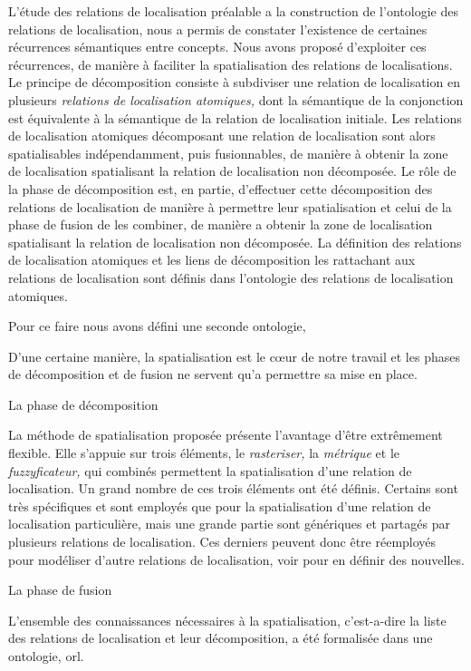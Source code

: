 L'étude des relations de localisation préalable a la construction de
l'ontologie des relations de localisation, nous a permis de constater
l’existence de certaines récurrences sémantiques entre concepts. Nous
avons proposé d'exploiter ces récurrences, de manière à faciliter la
spatialisation des relations de localisations. Le principe de
décomposition consiste à subdiviser une relation de localisation en
plusieurs \emph{relations de localisation atomiques,} dont la
sémantique de la conjonction est équivalente à la sémantique de la
relation de localisation initiale. Les relations de localisation
atomiques décomposant une relation de localisation sont alors
spatialisables indépendamment, puis fusionnables, de manière à obtenir
la zone de localisation spatialisant la relation de localisation non
décomposée.
%
Le rôle de la phase de décomposition est, en partie, d'effectuer cette
décomposition des relations de localisation de manière à permettre
leur spatialisation et celui de la phase de fusion de les combiner, de
manière a obtenir la zone de localisation spatialisant la relation de
localisation non décomposée.
%
La définition des relations de localisation atomiques et les liens de
décomposition les rattachant aux relations de localisation sont
définis dans l'ontologie des relations de localisation atomiques.


Pour ce faire nous
avons défini une seconde ontologie, 


D'une certaine manière, la spatialisation est le cœur de notre travail
et les phases de décomposition et de fusion ne servent qu'a permettre
sa mise en place.


La phase de décomposition

La méthode de spatialisation proposée présente l'avantage d'être
extrêmement flexible. Elle s'appuie sur trois éléments, le
\emph{rasteriser,} la \emph{métrique} et le \emph{fuzzyficateur,} qui
combinés permettent la spatialisation d'une relation de
localisation. Un grand nombre de ces trois éléments ont été
définis. Certains sont très spécifiques et sont employés que pour la
spatialisation d'une relation de localisation particulière, mais une
grande partie sont génériques et partagés par plusieurs relations de
localisation. Ces derniers peuvent donc être réemployés pour modéliser
d'autre relations de localisation, voir pour en définir des nouvelles.

La phase de fusion

L'ensemble des connaissances nécessaires à la spatialisation,
c'est-a-dire la liste des relations de localisation et leur
décomposition, a été formalisée dans une ontologie, \ac{orl}.

